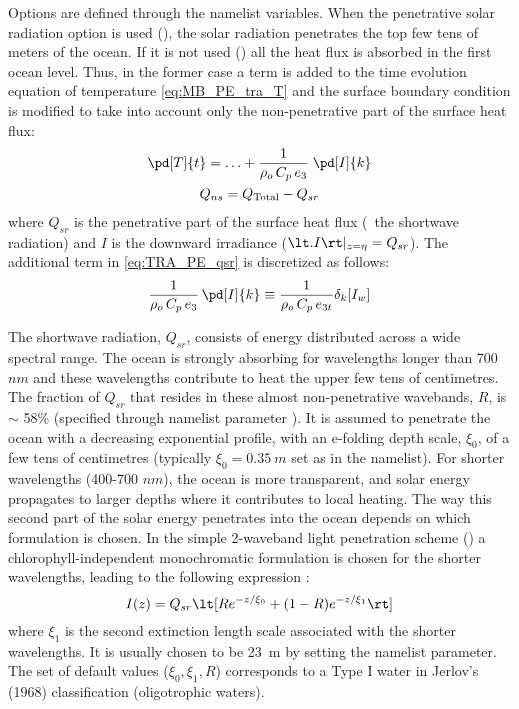 \documentclass[../main/NEMO_manual]{subfiles}
\begin{document}
Options are defined through the  namelist variables.
When the penetrative solar radiation option is used (),
the solar radiation penetrates the top few tens of meters of the ocean.
If it is not used () all the heat flux is absorbed in
the first ocean level.
Thus, in the former case a term is added to the time evolution equation of temperature
\autoref{eq:MB_PE_tra_T} and the surface boundary condition is modified to
take into account only the non-penetrative part of the surface heat flux:
\begin{equation}
  \label{eq:TRA_PE_qsr}
  \begin{gathered}
    \pd[T]{t} = \ldots + \frac{1}{\rho_o \, C_p \, e_3} \; \pd[I]{k} \\
    Q_{ns} = Q_\text{Total} - Q_{sr}
  \end{gathered}
\end{equation}
where $Q_{sr}$ is the penetrative part of the surface heat flux (\ie\ the shortwave radiation) and
$I$ is the downward irradiance ($\lt. I \rt|_{z = \eta} = Q_{sr}$).
The additional term in \autoref{eq:TRA_PE_qsr} is discretized as follows:
\begin{equation}
  \label{eq:TRA_qsr}
  \frac{1}{\rho_o \, C_p \, e_3} \, \pd[I]{k} \equiv \frac{1}{\rho_o \, C_p \, e_{3t}} \delta_k [I_w]
\end{equation}

The shortwave radiation, $Q_{sr}$, consists of energy distributed across a wide spectral range.
The ocean is strongly absorbing for wavelengths longer than 700 $nm$ and
these wavelengths contribute to heat the upper few tens of centimetres.
The fraction of $Q_{sr}$ that resides in these almost non-penetrative wavebands, $R$, is $\sim$ 58\%
(specified through namelist parameter ).
It is assumed to penetrate the ocean with a decreasing exponential profile,
with an e-folding depth scale, $\xi_0$, of a few tens of centimetres
(typically $\xi_0 = 0.35~m$ set as  in the  namelist).
For shorter wavelengths (400-700 $nm$), the ocean is more transparent,
and solar energy propagates to larger depths where it contributes to local heating.
The way this second part of the solar energy penetrates into
the ocean depends on which formulation is chosen.
In the simple 2-waveband light penetration scheme ()
a chlorophyll-independent monochromatic formulation is chosen for the shorter wavelengths,
leading to the following expression \citep{paulson.simpson_JPO77}:
\[
  I(z) = Q_{sr} \lt[ Re^{- z / \xi_0} + (1 - R) e^{- z / \xi_1} \rt]
\]
where $\xi_1$ is the second extinction length scale associated with the shorter wavelengths.
It is usually chosen to be 23~m by setting the  namelist parameter.
The set of default values ($\xi_0, \xi_1, R$) corresponds to
a Type I water in Jerlov's (1968) classification (oligotrophic waters).
\end{document}

